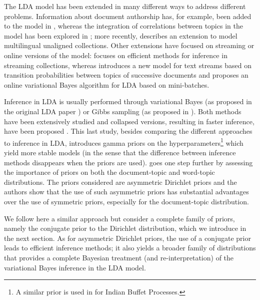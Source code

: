 
The LDA model \cite{blei_latent_2003} has been extended in many different ways to address different problems. Information about document authorship has, for example, been added to the model in \cite{Rosen_Zvi_2004}, whereas the integration of correlations between topics in the model has been explored in \cite{blei_correlated_2007}; more recently, \cite{Boyd_Graber_2009} describes an extension to model multilingual unaligned collections. Other extensions have focused on streaming or online versions of the model: \cite{Yao_2009} focuses on efficient methods for inference in streaming collections, whereas \cite{Wang_2012} introduces a new model for text streams based on transition probabilities between topics of successive documents and \cite{hoffman_online_2010} proposes an online variational Bayes algorithm for LDA based on mini-batches.

Inference in LDA is usually performed through variational Bayes (as proposed in the original LDA paper \cite{blei_latent_2003}) or Gibbs sampling (as proposed in \cite{griffiths04finding}). Both methods have been extensively studied and collapsed versions, resulting in faster inference, have been proposed \cite{teh_collapsed_2006,porteous_fast_2008}. This last study, besides comparing the different approaches to inference in LDA, introduces gamma priors on the hyperparameters\footnote{A similar prior is used in \cite{Gorur_2006} for Indian Buffet Processes.} which yield more stable models (in the sense that the difference between inference methods disappears when the priors are used). \cite{wallach_rethinking_2009} goes one step further by assessing the importance of priors on both the document-topic and word-topic distributions. The priors considered are asymmetric Dirichlet priors and the authors show that the use of such asymmetric priors has substantial advantages over the use of symmetric priors, especially for the document-topic distribution.

We follow here a similar approach but consider a complete family of priors, namely the conjugate prior to the Dirichlet distribution, which we introduce in the next section. As for asymmetric Dirichlet priors, the use of a conjugate prior leads to efficient inference methods; it also yields a broader family of distributions that provides a complete Bayesian treatment (and re-interpretation) of the variational Bayes inference in the LDA model.
